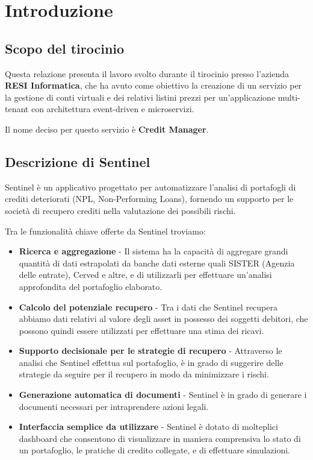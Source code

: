 \chapter{Introduzione}

\section{Scopo del tirocinio}
Questa relazione presenta il lavoro svolto durante il tirocinio presso l'azienda \textbf{RESI Informatica}, che ha avuto come obiettivo la creazione di un servizio per la
gestione di conti virtuali e dei relativi listini prezzi per un'applicazione multi-tenant con architettura event-driven e microservizi.

Il nome deciso per questo servizio \`e \textbf{Credit Manager}.

\section{Descrizione di Sentinel}
Sentinel \`e un applicativo progettato per automatizzare l'analisi di portafogli di crediti deteriorati (NPL, Non-Performing Loans), fornendo un supporto per le societ\`a
di recupero crediti nella valutazione dei possibili rischi.

Tra le funzionalit\`a chiave offerte da Sentinel troviamo:
\begin{itemize}
  \item \textbf{Ricerca e aggregazione} - Il sistema ha la capacit\`a di aggregare grandi quantit\`a di dati estrapolati da banche dati esterne quali SISTER (Agenzia delle entrate), Cerved e altre, e di utilizzarli
    per effettuare un'analisi approfondita del portafoglio elaborato.
  \item \textbf{Calcolo del potenziale recupero} - Tra i dati che Sentinel recupera abbiamo dati relativi al valore degli asset in possesso dei soggetti debitori, che possono
    quindi essere utilizzati per effettuare una stima dei ricavi.
  \item \textbf{Supporto decisionale per le strategie di recupero} - Attraverso le analisi che Sentinel effettua sul portafoglio, \`e in grado di suggerire delle strategie
    da seguire per il recupero in modo da minimizzare i rischi.
  \item \textbf{Generazione automatica di documenti} - Sentinel \`e in grado di generare i documenti necessari per intraprendere azioni legali.
  \item \textbf{Interfaccia semplice da utilizzare} - Sentinel \`e dotato di molteplici dashboard che consentono di visualizzare in maniera comprensiva lo stato di un portafoglio,
    le pratiche di credito collegate, e di effettuare simulazioni.
\end{itemize}


